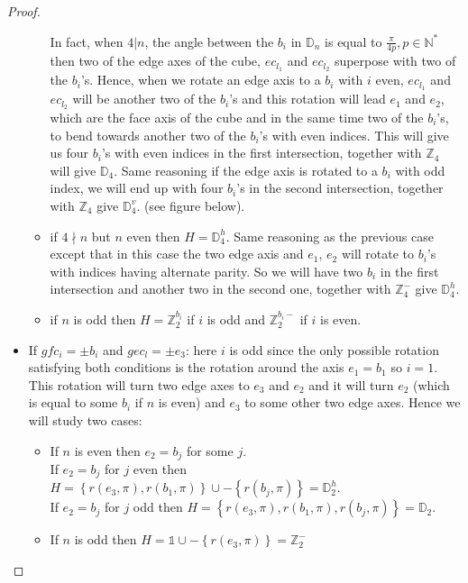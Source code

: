 \documentclass[11pt,a4paper]{amsart}
\theoremstyle{definition}
\newcommand{\ZZ}{\mathbb{Z}}                %
\newcommand{\NN}{\mathbb{N}}                %
\newcommand{\DD}{\mathbb{D}}                %
\newcommand{\1}{\mathds{1}}		            %
\newcommand{\set}[1]{\left\{#1\right\}}     %
\begin{document}
\begin{proof}
\begin{itemize}
\begin{itemize}
In fact, when $4|n$, the angle between the $b_i$ in $\DD_n$ is equal to $\frac{\pi}{4p}, p\in\NN^*$ then two of the edge axes of the cube, $ec_{l_1}$ and $ec_{l_2}$ superpose with two of the $b_i$'s. Hence, when we rotate an edge axis to a $b_i$ with $i$ even, $ec_{l_1}$ and $ec_{l_2}$ will be another two of the $b_i$'s and this rotation will lead $e_1$ and $e_2$, which are the face axis of the cube and in the same time two of the $b_i$'s, to bend towards another two of the $b_i$'s with even indices. This will give us four $b_i$'s with even indices in the first intersection, together with $\ZZ_4$ will give $\DD_4$. Same reasoning if the edge axis is rotated to a $b_i$ with odd index, we will end up with four $b_i$'s in the second intersection, together with $\ZZ_4$ give $\DD_4^v$. (see figure below).
\item if $4 \nmid n$ but $n$ even then $H=\DD_4^h$.
Same reasoning as the previous case except that in this case the two edge axis and $e_1$, $e_2$ will rotate to $b_i$'s with indices having alternate parity. So we will have two $b_i$ in the first intersection and another two in the second one, together with $\ZZ_4^-$ give $\DD_4^h$.
\item if $n$ is odd then $H=\ZZ_2^{b_i}$ if $i$ is odd and $\ZZ_2^{b_i-}$ if $i$ is even.
\end{itemize}
\item If $gfc_i=\pm b_i$ and $gec_l=\pm e_3$: here $i$ is odd since the only possible rotation satisfying both conditions is the rotation around the axis $e_1=b_1$ so $i=1$. This rotation will turn two edge axes to $e_3$ and $e_2$ and it will turn $e_2$ (which is equal to some $b_i$ if $n$ is even) and $e_3$ to some other two edge axes. Hence we will study two cases:
\begin{itemize}
\item If $n$ is even then $e_2=b_j$ for some $j$. \\
If $e_2=b_j$ for $j$ even then $H=\set{r(e_3,\pi),r(b_1,\pi)}\cup -\set{r(b_j,\pi)}=\DD_2^h$.\\
If $e_2=b_j$ for $j$ odd then $H=\set{r(e_3,\pi),r(b_1,\pi),r(b_j,\pi)}=\DD_2$.
\item If $n$ is odd then $H=\1\cup -\set{r(e_3,\pi)}=\ZZ_2^-$
\end{itemize}
\end{itemize}
\end{proof}
\end{document}
